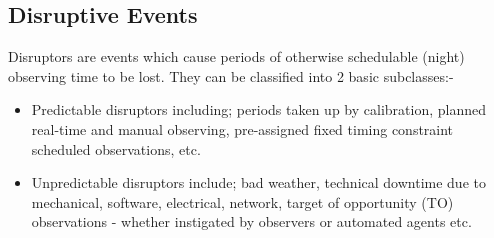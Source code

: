 \subsection{Disruptive Events}
Disruptors are events which cause periods of otherwise schedulable (night) observing time to be lost.
They can be classified into 2 basic subclasses:-
\begin{itemize}
\item Predictable disruptors including; periods taken up by calibration, planned real-time and manual observing, pre-assigned fixed timing constraint scheduled observations, etc.
\item Unpredictable disruptors include; bad weather, technical downtime due to mechanical, software, electrical, network, target of opportunity (TO) observations - whether instigated by observers or automated agents etc.
\end{itemize}

